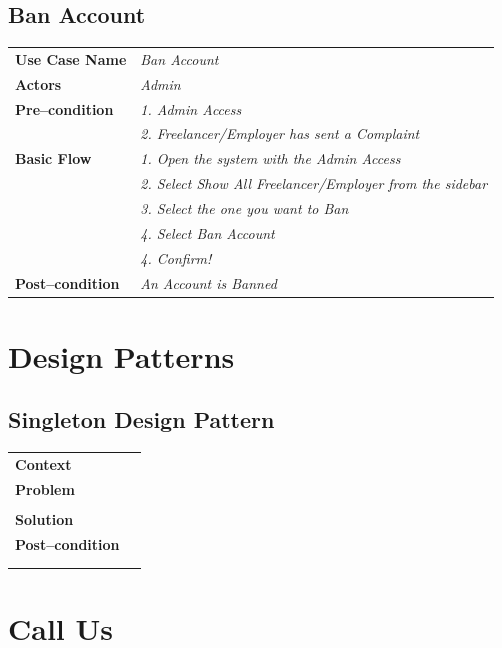 \documentclass{article}
\begin{document}
\subsection{Ban Account}
    \begin{tabular}{ l | l }
    \toprule
      \rowcolor{LightCyan}
      \textbf{Use Case Name}    & \textit{Ban Account}\\
      \textbf{Actors}           & \textit{Admin}\\
      \rowcolor{LightCyan}
      \textbf{Pre--condition}   & \textit{1. Admin Access}\\
                                  \rowcolor{LightCyan}
                                & \textit{2. Freelancer/Employer has sent a Complaint}\\
      \textbf{Basic Flow}       & \textit{1. Open the system with the Admin Access}\\
                                & \textit{2. Select Show All Freelancer/Employer from the sidebar}\\
                                & \textit{3. Select the one you want to Ban}\\
                                & \textit{4. Select Ban Account}\\
                                & \textit{4. Confirm!}\\
      \rowcolor{LightCyan}
      \textbf{Post--condition}  & \textit{An Account is Banned}\\
    \toprule
    \end{tabular}






\newpage


\section{Design Patterns}

\subsection{Singleton Design Pattern}
    \begin{tabular}{ l | l }
    \toprule
      \rowcolor{LightCyan}
      \textbf{Context}            & \textit{}\\
      \textbf{Problem}            & \textit{}\\
                                  & \textit{}\\
      \rowcolor{LightCyan}
      \textbf{Solution}           & \textit{}\\
      \textbf{Post--condition}    & \textit{}\\
                                  & \textit{}\\
                                  & \textit{}\\
    \toprule
    \end{tabular}

\begin{figure}[ht!]
\centering
\end{figure}






\section{Call Us}
\end{document}
